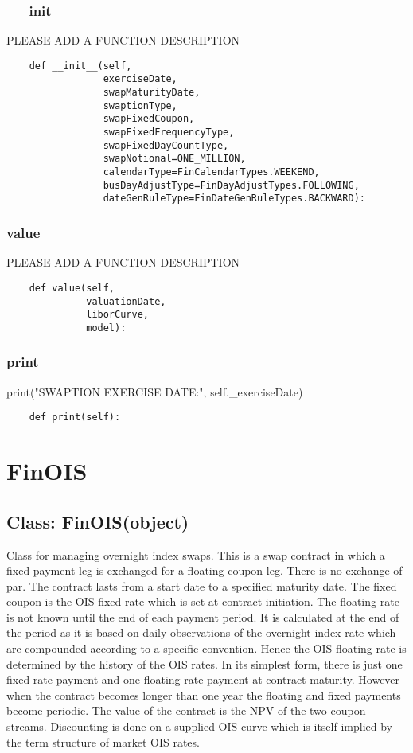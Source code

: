 \documentclass[twoside,11pt]{book}
\begin{document}
\subsubsection*{{\bf \_\_init\_\_}}
PLEASE ADD A FUNCTION DESCRIPTION

\begin{lstlisting}
    def __init__(self,
                 exerciseDate,
                 swapMaturityDate,
                 swaptionType,
                 swapFixedCoupon,
                 swapFixedFrequencyType,
                 swapFixedDayCountType,
                 swapNotional=ONE_MILLION,
                 calendarType=FinCalendarTypes.WEEKEND,
                 busDayAdjustType=FinDayAdjustTypes.FOLLOWING,
                 dateGenRuleType=FinDateGenRuleTypes.BACKWARD):
\end{lstlisting}

\subsubsection*{{\bf value}}
PLEASE ADD A FUNCTION DESCRIPTION

\begin{lstlisting}
    def value(self,
              valuationDate,
              liborCurve,
              model):
\end{lstlisting}

\subsubsection*{{\bf print}}
print("SWAPTION EXERCISE DATE:", self.\_exerciseDate) 

\begin{lstlisting}
    def print(self):
\end{lstlisting}

\newpage
\section{FinOIS}

\subsection*{Class: FinOIS(object)}
Class for managing overnight index swaps. This is a swap contract in which a fixed payment leg is exchanged for a floating coupon leg. There is no exchange of par.  The contract lasts from a start date to a specified maturity date.  The fixed coupon is the OIS fixed rate which is set at contract initiation.  The floating rate is not known until the end of each payment period. It is calculated at the end of the period as it is based on daily observations of the overnight index rate which are compounded according to a specific convention. Hence the OIS floating rate is determined by the history of the OIS rates.  In its simplest form, there is just one fixed rate payment and one floating rate payment at contract maturity. However when the contract becomes longer than one year the floating and fixed payments become periodic.  The value of the contract is the NPV of the two coupon streams. Discounting is done on a supplied OIS curve which is itself implied by the term structure of market OIS rates.  
\end{document}
